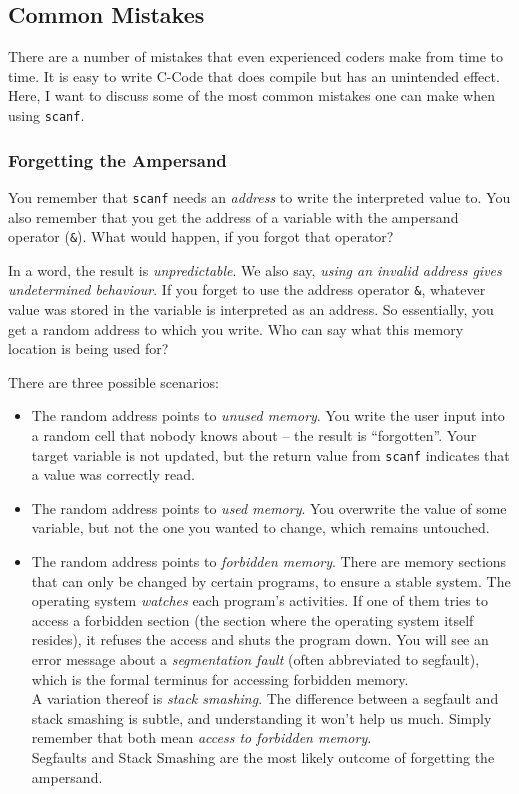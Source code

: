 {\subsection{Common Mistakes} \label{sec:scanfMistakes}
There are a number of mistakes that even experienced coders make from time to time. It is easy to write C-Code that does compile but has an unintended effect. Here, I want to discuss some of the most common mistakes one can make when using \texttt{scanf}.

\subsubsection{Forgetting the Ampersand}
You remember that \texttt{scanf} needs an \emph{address} to write the interpreted value to. You also remember that you get the address of a variable with the ampersand operator (\texttt{\&}).  What would happen, if you forgot that operator?

In a word, the result is \emph{unpredictable}. We also say, \emph{using an invalid address gives undetermined behaviour}. If you forget to use the address operator \texttt{\&}, whatever value was stored in the variable is interpreted as an address. So essentially, you get a random address to which you write. Who can say what this memory location is being used for?

There are three possible scenarios:
\begin{itemize}
\item The random address points to \emph{unused memory}. You write the user input into a random cell that nobody knows about -- the result is \enquote{forgotten}.
	Your target variable is not updated, but the return value from \texttt{scanf} indicates that a value was correctly read.
\item The random address points to \emph{used memory}. You overwrite the value of some variable, but not the one you wanted to change, which remains untouched.
\item The random address points to \emph{forbidden memory}. There are memory sections that can only be changed by certain programs, to ensure a stable system. The operating system
	\emph{watches} each program's activities. If one of them tries to access a forbidden section (\eg the section where the operating system itself resides), it refuses the access and
	shuts the program down. You will see an error message about a \emph{segmentation fault} (often abbreviated to segfault), which is the formal terminus for accessing forbidden memory.\\
	A variation thereof is \emph{stack smashing}. The difference between a segfault and stack smashing is subtle, and understanding it won't help us much.
	Simply remember that both mean \emph{access to forbidden memory}.\\
	Segfaults and Stack Smashing are the most likely outcome of forgetting the ampersand.
\end{itemize}

}
